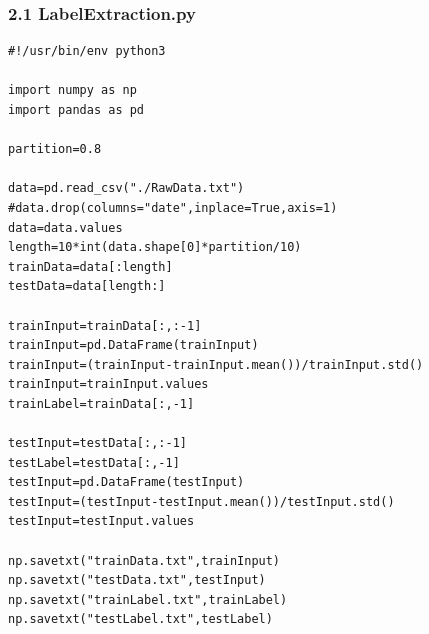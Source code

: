 \documentclass[12pt]{ctexart}
\begin{document}
\subsubsection*{2.1 LabelExtraction.py}
\begin{scriptsize}
\begin{verbatim}
#!/usr/bin/env python3

import numpy as np
import pandas as pd

partition=0.8

data=pd.read_csv("./RawData.txt")
#data.drop(columns="date",inplace=True,axis=1)
data=data.values
length=10*int(data.shape[0]*partition/10)
trainData=data[:length]
testData=data[length:]

trainInput=trainData[:,:-1]
trainInput=pd.DataFrame(trainInput)
trainInput=(trainInput-trainInput.mean())/trainInput.std()
trainInput=trainInput.values
trainLabel=trainData[:,-1]

testInput=testData[:,:-1]
testLabel=testData[:,-1]
testInput=pd.DataFrame(testInput)
testInput=(testInput-testInput.mean())/testInput.std()
testInput=testInput.values

np.savetxt("trainData.txt",trainInput)
np.savetxt("testData.txt",testInput)
np.savetxt("trainLabel.txt",trainLabel)
np.savetxt("testLabel.txt",testLabel)

\end{verbatim}
\end{scriptsize}
\end{document}
